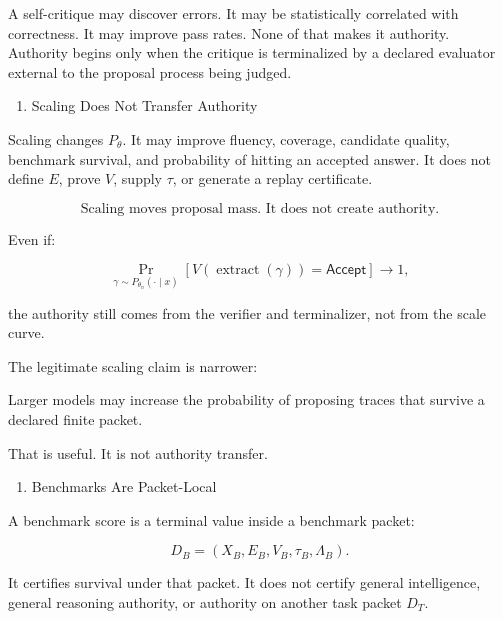 \documentclass[
  10pt,
]{article}
\providecommand{\tightlist}{%
  \setlength{\itemsep}{0pt}\setlength{\parskip}{0pt}}
\providecommand{\tightlist}{%
  \setlength{\itemsep}{0pt}\setlength{\parskip}{0pt}}
\renewenvironment{quote}
  {\begin{leftbar}\small}
  {\end{leftbar}}
\begin{document}
A self-critique may discover errors. It may be statistically correlated with correctness. It may improve pass rates. None of that makes it authority. Authority begins only when the critique is terminalized by a declared evaluator external to the proposal process being judged.

\begin{enumerate}
\def\labelenumi{\arabic{enumi}.}
\setcounter{enumi}{7}
\tightlist
\item
  Scaling Does Not Transfer Authority
\end{enumerate}

Scaling changes \protect\hypertarget{math-E0128-0170}{}{\(P_\theta\)}. It may improve fluency, coverage, candidate quality, benchmark survival, and probability of hitting an accepted answer. It does not define \protect\hypertarget{math-E0028-0171}{}{\(E\)}, prove \protect\hypertarget{math-E0012-0172}{}{\(V\)}, supply \protect\hypertarget{math-E0014-0173}{}{\(\tau\)}, or generate a replay certificate.

\protect\hypertarget{math-E0129-0174}{}{\[
\boxed{
\text{Scaling moves proposal mass. It does not create authority.}
}
\]}

Even if:

\protect\hypertarget{math-E0130-0175}{}{\[
\Pr_{\gamma\sim P_{\theta_n}(\cdot\mid x)}
[V(\operatorname{extract}(\gamma))=\mathsf{Accept}]
\to 1,
\]}

the authority still comes from the verifier and terminalizer, not from the scale curve.

The legitimate scaling claim is narrower:

\begin{quote}
Larger models may increase the probability of proposing traces that survive a declared finite packet.
\end{quote}

That is useful. It is not authority transfer.

\begin{enumerate}
\def\labelenumi{\arabic{enumi}.}
\setcounter{enumi}{8}
\tightlist
\item
  Benchmarks Are Packet-Local
\end{enumerate}

A benchmark score is a terminal value inside a benchmark packet:

\protect\hypertarget{math-E0131-0176}{}{\[
D_B=(X_B,E_B,V_B,\tau_B,\Lambda_B).
\]}

It certifies survival under that packet. It does not certify general intelligence, general reasoning authority, or authority on another task packet \protect\hypertarget{math-E0132-0177}{}{\(D_T\)}.
\end{document}
